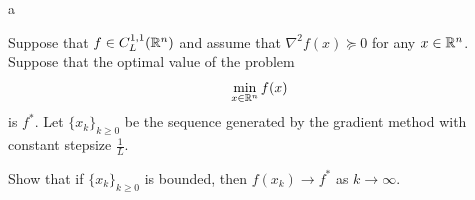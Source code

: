 \documentclass{ExerciseSheet}
\newif\ifsolutions
\begin{document}


a\vskip 0.5cm 

\begin{problem}
Suppose that $f \in C^{1,1}_L(\mathbb{R}^n)$ and assume that $\nabla^2 f(x) \succcurlyeq 0$ for any $x \in \mathbb{R}^n$. Suppose that the optimal value of the problem 
\begin{align*}
    \min_{x\in\mathbb{R}^n} f(x)
\end{align*} 
is $f^*$. Let $\{ x_k\}_{k \geq0}$ be the sequence generated by the gradient method with constant stepsize $\frac{1}{L}$. \vspace{0.3cm}

Show that if $\{ x_k\}_{k \geq0}$ is bounded, then $f(x_k) \to f^*$ as $k \to \infty$.

\end{problem}

\ifsolutions
\vskip 0.3cm
\end{document}
